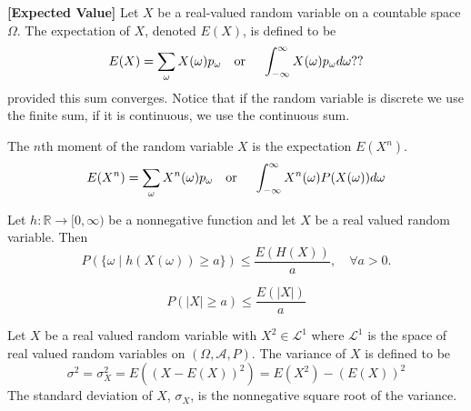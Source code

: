 \documentclass[../main.tex]{subfiles}
\begin{document}
\begin{definition}

\end{definition}



















\begin{definition}\textbf{[Expected Value]}\label{def:expected value}
Let $X$ be a real-valued random variable on a countable space $\Omega$. The expectation of $X$, denoted $E(X)$, is defined to be 
\[
E(X) = \sum_{\omega}{X(\omega)p_\omega} \quad \textnormal{or } \quad \int_{-\infty}^{\infty}X(\omega)p_\omega d\omega??
\]
provided this sum converges. Notice that if the random variable is discrete we use the finite sum, if it is continuous, we use the continuous sum.
\end{definition}

\begin{definition}
The $n$th moment of the random variable $X$ is the expectation $E(X^n)$. 
\[
E(X^n) = \sum_{\omega}{X^n(\omega)p_\omega} \quad \textnormal{or } \quad \int_{-\infty}^{\infty}X^n(\omega)P(X(\omega)) d\omega
\]
\end{definition}



\begin{theorem}
Let $h: \mathbb{R} \to [0,\infty)$ be a nonnegative function and let $X$ be a real valued random variable. Then 
\[
P(\{\omega \mid h(X(\omega)) \geq a\}) \leq \frac{E(H(X))}{a}, \quad \forall a > 0.
\]
\end{theorem}



\begin{corollary} \label{Markovs Inequality}
\[
P({|X| \geq a}) \leq \frac{E(|X|)}{a}
\]

\end{corollary}



\begin{definition}\label{def: Variance and Standard Deviation}
Let $X$ be a real valued random variable with $X^2 \in \mathcal{L}^1$ where $\mathcal{L}^1$ is the space of real valued random variables on $(\Omega, \mathcal{A}, P)$. The variance of $X$ is defined to be
\[
\sigma^2 = \sigma^2_X = E((X - E(X))^2) = E(X^2) - (E(X))^2
\]
The standard deviation of $X$, $\sigma_X$, is the nonnegative square root of the variance. 

\end{definition}
\end{document}
